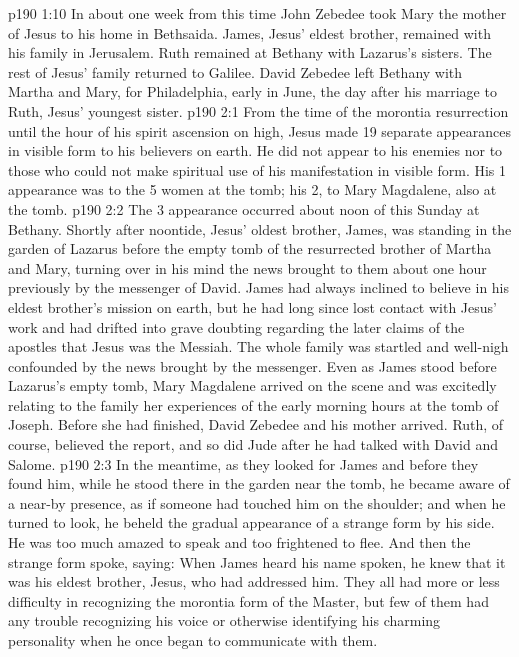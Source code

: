 \vs p190 1:10 In about one week from this time John Zebedee took Mary the mother of Jesus to his home in Bethsaida. James, Jesus’ eldest brother, remained with his family in Jerusalem. Ruth remained at Bethany with Lazarus’s sisters. The rest of Jesus’ family returned to Galilee. David Zebedee left Bethany with Martha and Mary, for Philadelphia, early in June, the day after his marriage to Ruth, Jesus’ youngest sister.
\vs p190 2:1 From the time of the morontia resurrection until the hour of his spirit ascension on high, Jesus made 19 separate appearances in visible form to his believers on earth. He did not appear to his enemies nor to those who could not make spiritual use of his manifestation in visible form. His 1 appearance was to the 5 women at the tomb; his 2, to Mary Magdalene, also at the tomb.
\vs p190 2:2 The 3 appearance occurred about noon of this Sunday at Bethany. Shortly after noontide, Jesus’ oldest brother, James, was standing in the garden of Lazarus before the empty tomb of the resurrected brother of Martha and Mary, turning over in his mind the news brought to them about one hour previously by the messenger of David. James had always inclined to believe in his eldest brother’s mission on earth, but he had long since lost contact with Jesus’ work and had drifted into grave doubting regarding the later claims of the apostles that Jesus was the Messiah. The whole family was startled and well\hyp{}nigh confounded by the news brought by the messenger. Even as James stood before Lazarus’s empty tomb, Mary Magdalene arrived on the scene and was excitedly relating to the family her experiences of the early morning hours at the tomb of Joseph. Before she had finished, David Zebedee and his mother arrived. Ruth, of course, believed the report, and so did Jude after he had talked with David and Salome.
\vs p190 2:3 In the meantime, as they looked for James and before they found him, while he stood there in the garden near the tomb, he became aware of a near-by presence, as if someone had touched him on the shoulder; and when he turned to look, he beheld the gradual appearance of a strange form by his side. He was too much amazed to speak and too frightened to flee. And then the strange form spoke, saying:  When James heard his name spoken, he knew that it was his eldest brother, Jesus, who had addressed him. They all had more or less difficulty in recognizing the morontia form of the Master, but few of them had any trouble recognizing his voice or otherwise identifying his charming personality when he once began to communicate with them.
